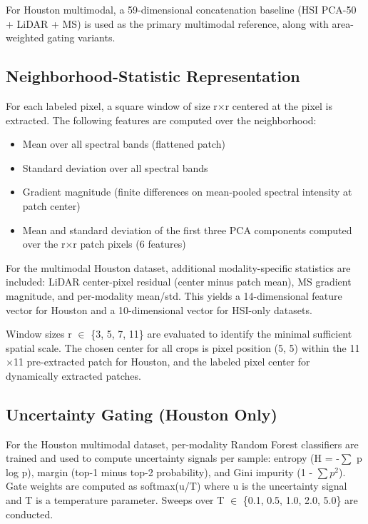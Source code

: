 \documentclass[
  journal]{IEEEtran}
\providecommand{\tightlist}{%
  \setlength{\itemsep}{0pt}\setlength{\parskip}{0pt}}
\begin{document}
For Houston multimodal, a 59-dimensional concatenation baseline (HSI
PCA-50 + LiDAR + MS) is used as the primary multimodal reference, along
with area-weighted gating variants.

\subsection{Neighborhood-Statistic
Representation}\label{neighborhood-statistic-representation}

For each labeled pixel, a square window of size r\(\times\)r centered at the
pixel is extracted. The following features are computed over the
neighborhood:

\begin{itemize}
\tightlist
\item
  Mean over all spectral bands (flattened patch)
\item
  Standard deviation over all spectral bands
\item
  Gradient magnitude (finite differences on mean-pooled spectral
  intensity at patch center)
\item
  Mean and standard deviation of the first three PCA components computed
  over the r\(\times\)r patch pixels (6 features)
\end{itemize}

For the multimodal Houston dataset, additional modality-specific
statistics are included: LiDAR center-pixel residual (center minus patch
mean), MS gradient magnitude, and per-modality mean/std. This yields a
14-dimensional feature vector for Houston and a 10-dimensional vector
for HSI-only datasets.

Window sizes r \(\in\) \{3, 5, 7, 11\} are evaluated to identify the minimal
sufficient spatial scale. The chosen center for all crops is pixel
position (5, 5) within the 11\(\times\)11 pre-extracted patch for Houston, and
the labeled pixel center for dynamically extracted patches.

\subsection{Uncertainty Gating (Houston
Only)}\label{uncertainty-gating-houston-only}

For the Houston multimodal dataset, per-modality Random Forest
classifiers are trained and used to compute uncertainty signals per
sample: entropy (H = -\(\sum\) p log p), margin (top-1 minus top-2
probability), and Gini impurity (1 - \(\sum p^2\)). Gate weights are computed as
softmax(u/T) where u is the uncertainty signal and T is a temperature
parameter. Sweeps over T \(\in\) \{0.1, 0.5, 1.0, 2.0, 5.0\} are conducted.
\end{document}
